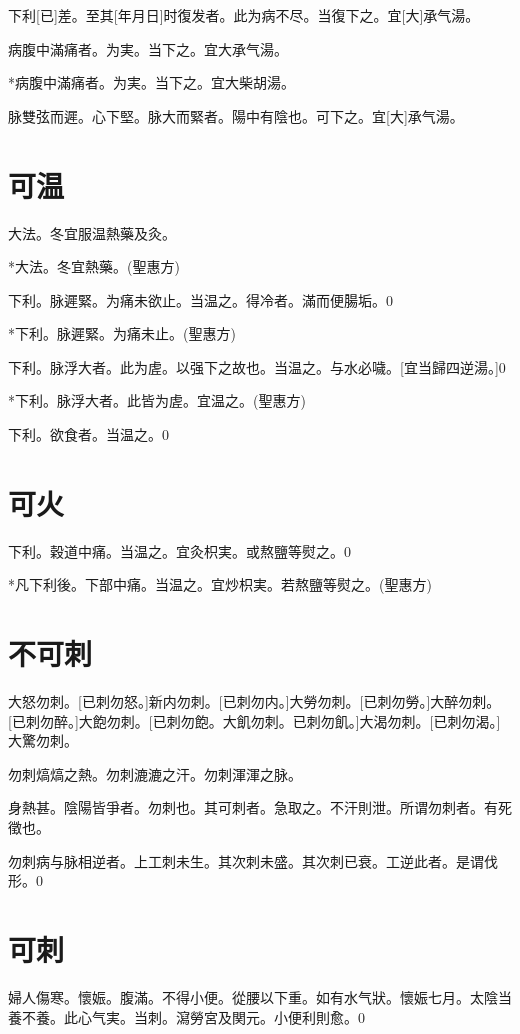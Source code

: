 \documentclass[12pt,twoside,UTF8,b5paper]{ctexbook}
\begin{document}
下利[已]差。至其[年月日]时復发者。此为病不尽。当復下之。宜[大]承气湯。

病腹中滿痛者。为実。当下之。宜大承气湯。

*病腹中滿痛者。为実。当下之。宜大柴胡湯。

脉雙弦而遲。心下堅。脉大而緊者。陽中有陰也。可下之。宜[大]承气湯。

\chapter{可温}

大法。冬宜服温熱藥及灸。

*大法。冬宜熱藥。(聖惠方)

下利。脉遲緊。为痛未欲止。当温之。得冷者。滿而便腸垢。0

*下利。脉遲緊。为痛未止。(聖惠方)

下利。脉浮大者。此为虗。以强下之故也。当温之。与水必噦。[宜当歸四逆湯。]0

*下利。脉浮大者。此皆为虗。宜温之。(聖惠方)

下利。欲食者。当温之。0

\chapter{可火}

下利。穀道中痛。当温之。宜灸枳実。或熬鹽等熨之。0

*凡下利後。下部中痛。当温之。宜炒枳実。若熬鹽等熨之。(聖惠方)

\chapter{不可刺}

大怒勿刺。[已刺勿怒。]新内勿刺。[已刺勿内。]大勞勿刺。[已刺勿勞。]大醉勿刺。[已刺勿醉。]大飽勿刺。[已刺勿飽。大飢勿刺。已刺勿飢。]大渴勿刺。[已刺勿渴。]大驚勿刺。

勿刺熇熇之熱。勿刺漉漉之汗。勿刺渾渾之脉。

身熱甚。陰陽皆爭者。勿刺也。其可刺者。急取之。不汗則泄。所谓勿刺者。有死徵也。

勿刺病与脉相逆者。上工刺未生。其次刺未盛。其次刺已衰。工逆此者。是谓伐形。0

\chapter{可刺}

婦人傷寒。懷娠。腹滿。不得小便。從腰以下重。如有水气狀。懷娠七月。太陰当養不養。此心气実。当刺。瀉勞宮及関元。小便利則愈。0
\end{document}
